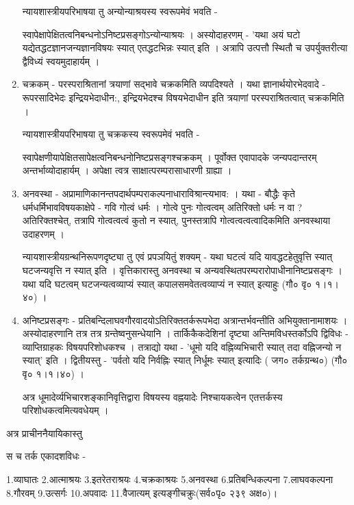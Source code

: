 \begin{enumerate}
न्यायशास्त्रीयपरिभाषया तु अन्योन्याश्रयस्य स्वरूपमेवं भवति - 

स्वापेक्षापेक्षितत्वनिबन्धनोऽनिष्टप्रसङ्गोऽन्योन्याश्रयः । अस्योदाहरणम् - 'यथा अयं घटो यद्येतद्धटज्ञानजन्यज्ञानविषयः स्यात् एतद्धटभिन्नः स्यात् इति । अत्रापि उत्पत्तौ स्थितौ च उपर्युक्तरीत्या द्वैविध्यं स्वयमुदाहार्यम् ।
\item	चक्रकम् - परस्पराश्रितानां त्रयाणां सद्भावे चक्रकमिति व्यपदिश्यते । यथा  ज्ञानार्थयोरभेदवादे - रूपरसादिभेदः इन्द्रियभेदाधीन:, इन्द्रियभेदश्च विषयभेदाधीन इति त्रयाणां परस्पराश्रितत्वात् चक्रकमिति । 

न्यायशास्त्रीयपरिभाषया तु चक्रकस्य स्वरूपमेवं भवति -  

स्वापेक्षणीयापेक्षितसापेक्षत्वनिबन्धनोनिष्टप्रसङ्गश्चक्रकम् । पूर्वोक्त एवापादके जन्यपदान्तरम् अन्तर्भाव्योदाहार्यम् । अपेक्षा त्वत्र साक्षात्परम्परासाधारणी ग्राह्या ।
\item	अनवस्था - अप्रामाणिकानन्तपदार्थपम्पराकल्पनाधाराविश्रान्त्यभाव: । यथा - बौद्धैः  कृते धर्मधर्मिभावविषयकाक्षेपे - गवि गोत्वं धर्मः । गोत्वे पुनः गोत्वत्वम् अतिरिक्तो धर्मः न वा ? अतिरिक्तश्चेत्, तत्रापि गोत्वत्वत्वं कुतो न स्यात्, पुनस्तत्रापि गोत्वत्वत्वत्वादिकमिति अनवस्थाया उदाहरणम् ।

न्यायशास्त्रीयग्रन्थनिरूपणदृष्ट्या तु एवं प्रपञयितुं शक्यम् - यथा घटत्वं यदि यावद्धटहेतुवृत्ति स्यात् घटजन्यवृत्ति न स्यात् इति । वृत्तिकारास्तु अनवस्था च अन्यवस्थितपरम्परारोपाधीनानिष्टप्रसङ्गः । यथा यदि घटत्वम् घटजन्यत्वव्याप्यं स्यात् कपालसमवेतत्वव्याप्यं न स्यात् इत्याहुः (गौ० वृ० १।१।४०) ।
\item	अनिष्टप्रसङ्गः - प्रतिबन्दिलाघवगौरवादयोऽतिरिक्ततर्करूपभेदा अत्रान्तर्भवन्तीति  अभियुक्तानामाशयः । अस्योदाहरणानि तत्र तत्र ग्रन्तेष्वनुसन्धेयानि । तार्किकैकदेशिनां दृष्ट्या अन्तिमविधस्तर्कोऽपि द्विविधः -  व्याप्तिग्राहकः विषयपरिशोधकश्च । तत्राद्यो यथा - 'धूमो यदि वह्निव्यभिचारी स्यात् तदा वह्निजन्यो न स्यात्' इति । द्वितीयस्तु - 'पर्वतो यदि निर्वह्निः स्यात् निर्धूमः स्यात् इत्यादिः ( जग० तर्कग्रन्थ०) (गौ० वृ० १।१।४०) । 

अत्र धूमादेर्व्यभिचारशङ्कानिवृत्तिद्वारा विषयस्य वह्नयादेः निश्चायकत्वेन एतत्तर्कस्य परिशोधकत्वमित्यवधेयम् । 
\end{enumerate}

अत्र प्राचीननैयायिकास्तु 

स च तर्क एकादशविधः - 

1.व्याघातः 2.आत्माश्रयः 3.इतरेतराश्रयः 4.चक्रकाश्रयः 5.अनवस्था 6.प्रतिबन्धिकल्पना  7.लाघवकल्पना 8.गौरवम् 9.उत्सर्गः 10.अपवादः 11.वैजात्यम् इत्यङ्गीचक्रुः(सर्व०पृ० २३९ अक्ष०)।

